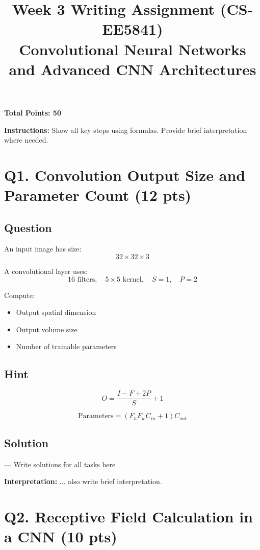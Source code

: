 \documentclass[11pt]{article}
\title{\textbf{Week 3 Writing Assignment (CS-EE5841)}\\Convolutional Neural Networks and Advanced CNN Architectures}
\author{}
\date{}
\begin{document}
\maketitle

\noindent \textbf{Total Points: 50}

\vspace{0.3cm}

\noindent \textbf{Instructions:} Show all key steps using formulas. Provide brief interpretation where needed.

\section*{Q1. Convolution Output Size and Parameter Count (12 pts)}

\subsection*{Question}

An input image has size:
\[
32 \times 32 \times 3
\]

A convolutional layer uses:
\[
16 \text{ filters}, \quad 5 \times 5 \text{ kernel}, \quad S=1, \quad P=2
\]

Compute:
\begin{itemize}
    \item Output spatial dimension
    \item Output volume size
    \item Number of trainable parameters
\end{itemize}

\subsection*{Hint}

\[
O=\frac{I-F+2P}{S}+1
\]

\[
\text{Parameters}=(F_hF_wC_{in}+1)C_{out}
\]

\subsection*{Solution}

--- Write solutions for all tasks here 

\noindent \textbf{Interpretation:} ... also write brief interpretation.

\section*{Q2. Receptive Field Calculation in a CNN (10 pts)}
\end{document}
